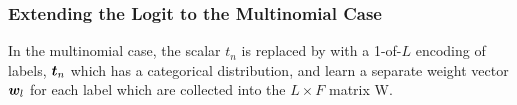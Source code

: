 %
%
%
%
%
%
%


\subsubsection*{Extending the Logit to the Multinomial Case}
In the multinomial case,  the scalar $t_n$ is replaced by with a 1-of-$L$ encoding of labels, $\bm t_n$ which has a categorical distribution, and learn a separate weight vector $\bm w_l$ for each label which are collected into the $L \times F$ matrix W. 

